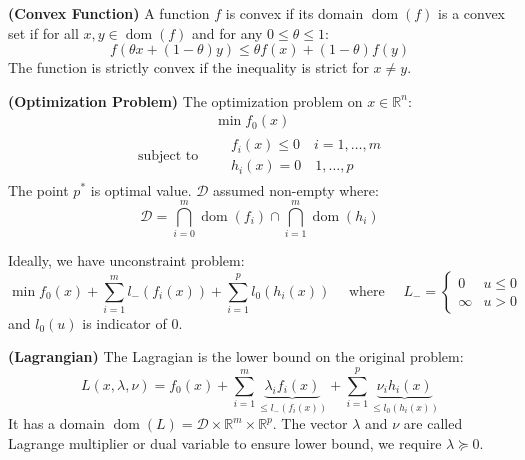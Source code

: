 \begin{definition}{\textbf{(Convex Function)}}
    A function $f$ is convex if its domain $\operatorname{dom}(f)$ is a convex set if for all $x, y\in\operatorname{dom}(f)$ and for any $0\le\theta\le1$:
    \begin{equation*}
        f(\theta x + (1-\theta)y) \le \theta f(x) + (1-\theta)f(y)
    \end{equation*}
    The function is strictly convex if the inequality is strict for $x\ne y$. 
\end{definition}

\begin{definition}{\textbf{(Optimization Problem)}}
    The optimization problem on $x\in \mathbb{R}^n$:
    \begin{equation*}
    \begin{aligned}
        &\min f_0(x) \\
        \text{ subject to }& \begin{aligned}
            &f_i(x)\le0 \quad i=1,\dots,m \\
            &h_i(x)=0 \quad 1,\dots,p
        \end{aligned}
    \end{aligned}
    \end{equation*}
    The point $p^*$ is optimal value. $\mathcal{D}$ assumed non-empty where:
    \begin{equation*}
        \mathcal{D} = \bigcap^m_{i=0}\operatorname{dom}(f_i)\cap\bigcap^m_{i=1}\operatorname{dom}(h_i)
    \end{equation*}
\end{definition}
\begin{remark}
    Ideally, we have unconstraint problem:
    \begin{equation*}
        \min f_0(x) + \sum^m_{i=1}l_-(f_i(x)) + \sum^p_{i=1}l_0(h_i(x)) \quad \text{ where } \quad L_-=\begin{cases}
            0 & u \le 0 \\
            \infty & u > 0
        \end{cases}
    \end{equation*}
    and $l_0(u)$ is indicator of $0$.
\end{remark}

\begin{definition}{\textbf{(Lagrangian)}}
    The Lagragian is the lower bound on the original problem:
    \begin{equation*}
        L(x, \lambda, \nu) = f_0(x) + \sum^m_{i=1}\underbrace{\lambda_if_i(x)}_{\le l_-(f_i(x))} + \sum^p_{i=1}\underbrace{\nu_ih_i(x)}_{\le l_0(h_i(x))}
    \end{equation*}
    It has a domain $\operatorname{dom}(L)=\mathcal{D}\times \mathbb{R}^m\times \mathbb{R}^p$. The vector $\lambda$ and $\nu$ are called Lagrange multiplier or dual variable to ensure lower bound, we require $\lambda\succeq0$.
\end{definition}

